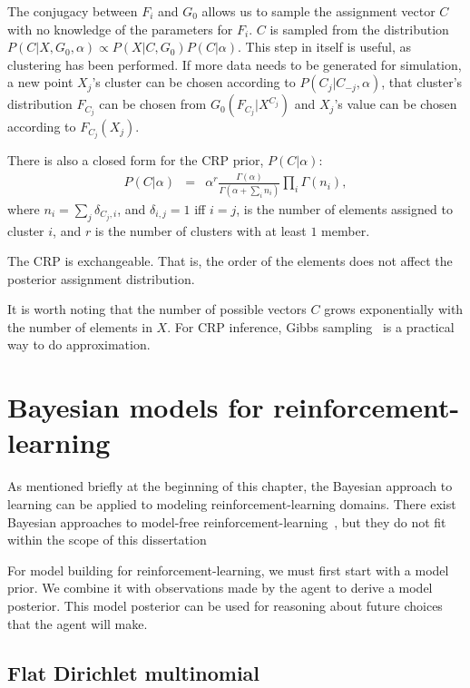 The conjugacy between $F_i$ and $G_0$ allows us to sample the assignment vector $C$ with no knowledge of the parameters for $F_i$. $C$ is sampled from the distribution $P(C|X,G_0,\alpha)\propto P(X|C,G_0)P(C|\alpha)$. This step in itself is useful, as clustering has been performed. If more data needs to be generated for simulation, a new point $X_j$'s cluster can be chosen according to $P(C_j|C_{-j},\alpha)$, that cluster's distribution $F_{C_j}$ can be chosen from $G_0(F_{C_j}|X^{C_j})$ and $X_j$'s value can be chosen according to $F_{C_j}(X_j)$.

There is also a closed form for the CRP prior, $P(C|\alpha)$:
\begin{eqnarray}
P(C|\alpha)&=&\alpha^r \frac {\Gamma(\alpha)}{\Gamma(\alpha+\sum_i n_i)}\prod_i\Gamma(n_i),\label{eq:crp}
\end{eqnarray}
where $n_i = \sum_{j} \delta_{C_j,i}$, and $\delta_{i,j}=1$ iff $i=j$, is the number of elements assigned to cluster $i$, and $r$ is the number of clusters with at least $1$ member.

The CRP is exchangeable. That is, the order of the elements does not affect the posterior assignment distribution.

It is worth noting that the number of possible vectors $C$ grows exponentially with the number of elements in $X$. For CRP inference, Gibbs sampling~\cite{andrieu03,neal00} is a practical way to do approximation.

\section{Bayesian models for reinforcement-learning}

As mentioned briefly at the beginning of this chapter, the Bayesian approach to learning can be applied to modeling reinforcement-learning domains. There exist Bayesian approaches to model-free reinforcement-learning~\cite{dearden98}, but they do not fit within the scope of this dissertation  

For model building for reinforcement-learning, we must first start with a model prior. We combine it with observations made by the agent to derive a model posterior. This model posterior can be used for reasoning about future choices that the agent will make.

\subsection{Flat Dirichlet multinomial}

